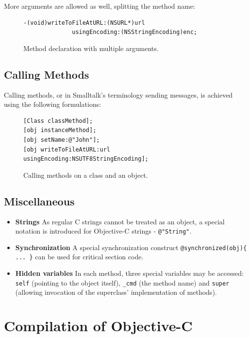 More arguments are allowed as well, splitting the method name:

\begin{figure}[H]
  \begin{verbatim}
-(void)writeToFileAtURL:(NSURL*)url 
              usingEncoding:(NSStringEncoding)enc;
  \end{verbatim}
  \centering{}
  \caption{Method declaration with multiple arguments.}
  \label{fig:syntax_objc_multiple_args}
\end{figure}

\subsection{Calling Methods}

Calling methods, or in Smalltalk's terminology sending messages, is achieved using the following formulations:

\begin{figure}[H]
  \begin{verbatim}
[Class classMethod];
[obj instanceMethod];
[obj setName:@"John"];
[obj writeToFileAtURL:url usingEncoding:NSUTF8StringEncoding];
  \end{verbatim}
  \centering{}
  \caption{Calling methods on a class and an object.}
  \label{fig:syntax_objc_msg_sending}
\end{figure}

\subsection{Miscellaneous}

\begin{itemize}
  \item{\bf{Strings}} As regular C strings cannot be treated as an object, a special notation is introduced for Objective-C strings - \verb=@"String"=.
  \item{\bf{Synchronization}} A special synchronization construct \newline{}\verb=@synchronized(obj){ ... }= can be used for critical section code.
  \item{\bf{Hidden variables}} In each method, three special variables may be accessed: \verb=self= (pointing to the object itself), \verb=_cmd= (the method name) and \verb=super= (allowing invocation of the superclass' implementation of methods).
\end{itemize}


\section{Compilation of Objective-C}

